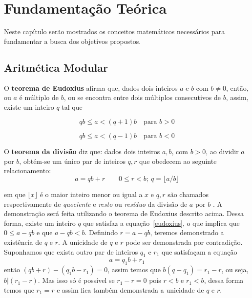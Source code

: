 \chapter{Fundamentação Teórica}
Neste capítulo serão mostrados os conceitos matemáticos necessários para fundamentar a busca dos objetivos propostos.

%
%
\section{Aritmética Modular}

O \textbf{teorema de Eudoxius} afirma que, dados dois inteiros \(a\) e \(b\) com \(b \neq 0\), então, ou \(a\) é múltiplo de \(b\), ou se encontra entre dois múltiplos 
consecutivos de \(b\), assim, existe um inteiro \(q\) tal que \cite{Santos:2014}

\begin{equation} \label{eudoxius}
  qb \leq a < (q + 1)b\quad\mbox{para \(b > 0\)}
\end{equation}

\begin{equation}
  qb \leq a < (q - 1)b\quad\mbox{para \(b < 0\)}
\end{equation}

O \textbf{teorema da divisão} diz que: dados dois inteiros $a, b$, com $b > 0$, ao dividir \(a\) por \(b\), obtém-se um único par de inteiros $q, r$ que obedecem ao seguinte relacionamento:
\begin{equation}
  a=qb+r \qquad 0 \leq r<b;\ q=\lfloor a/b \rfloor
\end{equation}

em que $\lfloor x \rfloor$ é o maior inteiro menor ou igual a \(x\) e $q,r$ são chamados respectivamente de \textit{quociente} e \textit{resto} ou \textit{resíduo} da divisão de \(a\) por \(b\) \cite{Santos:2014}. A demonstração será feita utilizando o teorema de Eudoxius descrito acima. Dessa forma, existe um inteiro \(q\) que satisfaz a equação~\ref{eudoxius}, o que implica que \(0 \leq a - qb\) e que \(a - qb < b\). Definindo \(r = a - qb\), teremos demonstrado a existência de \(q\) e \(r\). A unicidade de \(q\) e 
\(r\) pode ser demonstrada por contradição. Suponhamos que exista outro par de inteiros \(q_1\) e \(r_1\) que satisfaçam a equação
\begin{equation}
  a = q_1b + r_1
\end{equation}
então \((qb + r) - (q_1b - r_1) = 0\), assim temos que \(b(q - q_1) = r_1 - r\), ou seja, \(b|(r_1 - r)\). Mas isso só é possível se \(r_1 - r = 0\) 
pois \(r < b\) e \(r_1 < b\), dessa forma temos que \(r_1 = r\) 
e assim fica também demonstrada a unicidade de \(q\) e \(r\). \cite{Santos:2014}


